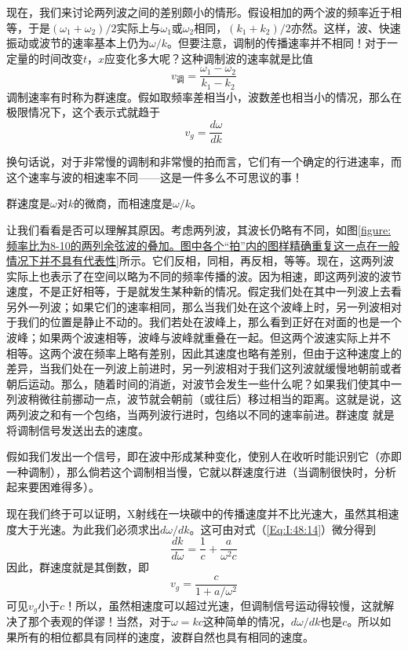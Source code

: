 现在，我们来讨论两列波之间的差别颇小的情形。假设相加的两个波的频率近于相等，于是$(\omega_1 +\omega_2)/2$实际上与$\omega_1$或$\omega_2$相同，$(k_1 +k_2)/2$亦然。这样，波、快速振动或波节的速率基本上仍为$\omega/k$。但要注意，调制的传播速率并不相同！对于一定量的时间改变$t$，$x$应变化多大呢？这种调制波的速率就是比值
\begin{equation}
    \label{Eq:I:48:16}
    v_\text{调} = \frac{\omega_1 - \omega_2}{k_1 - k_2}
\end{equation}
调制速率有时称为群速度。假如取频率差相当小，波数差也相当小的情况，那么在极限情况下，这个表示式就趋于
\begin{equation}
    \label{Eq:I:48:17}
    v_g = \frac{d\omega}{dk}
\end{equation}

换句话说，对于非常慢的调制和非常慢的拍而言，它们有一个确定的行进速率，而这个速率与波的相速率不同——这是一件多么不可思议的事！

群速度是$\omega$对$k$的微商，而相速度是$\omega/k$。

让我们看看是否可以理解其原因。考虑两列波，其波长仍略有不同，如图\ref{figure:频率比为8-10的两列余弦波的叠加。图中各个“拍”内的图样精确重复这一点在一般情况下并不具有代表性}所示。它们反相，同相，再反相，等等。现在，这两列波实际上也表示了在空间以略为不同的频率传播的波。因为相速，即这两列波的波节速度，不是正好相等，于是就发生某种新的情况。假定我们处在其中一列波上去看另外一列波；如果它们的速率相同，那么当我们处在这个波峰上时，另一列波相对于我们的位置是静止不动的。我们若处在波峰上，那么看到正好在对面的也是一个波峰；如果两个波速相等，波峰与波峰就重叠在一起。但这两个波速实际上并不 相等。这两个波在频率上略有差别，因此其速度也略有差别，但由于这种速度上的差异，当我们处在一列波上前进时，另一列波相对于我们这列波就缓慢地朝前或者朝后运动。那么，随着时间的消逝，对波节会发生一些什么呢？如果我们使其中一列波稍微往前挪动一点，波节就会朝前（或往后）移过相当的距离。这就是说，这两列波之和有一个包络，当两列波行进时，包络以不同的速率前进。群速度 就是将调制信号发送出去的速度。

假如我们发出一个信号，即在波中形成某种变化，使别人在收听时能识别它（亦即一种调制），那么倘若这个调制相当慢，它就以群速度行进（当调制很快时，分析起来要困难得多）。

现在我们终于可以证明，X射线在一块碳中的传播速度并不比光速大，虽然其相速度大于光速。为此我们必须求出$d\omega /dk$。这可由对式（\ref{Eq:I:48:14}）微分得到
\begin{equation*}
    \frac{dk}{d\omega} = \frac{1}{c} + \frac{a}{\omega^2 c}
\end{equation*}
因此，群速度就是其倒数，即
\begin{equation}
    \label{Eq:I:48:18}
    v_g = \frac{c}{1+a/\omega^2}
\end{equation}
可见$v_g$小于$c$！所以，虽然相速度可以超过光速，但调制信号运动得较慢，这就解决了那个表观的佯谬！当然，对于$\omega =kc$这种简单的情况，$d\omega/dk$也是$c$。所以如果所有的相位都具有同样的速度，波群自然也具有相同的速度。

